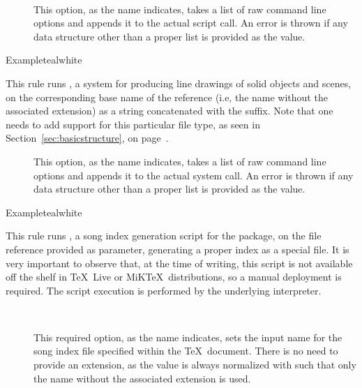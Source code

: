 \begin{description}
\begin{description}
\item[~\rqbox] This option, as the name indicates, takes a list of raw command line options and appends it to the actual script call. An error is thrown if any data structure other than a proper list is provided as the value.
\end{description}

\begin{codebox}{Example}{teal}{\icnote}{white}
\end{codebox}

\item[\rulebox{sketch}]
This rule runs , a system for producing line drawings of solid objects and scenes, on the corresponding base name of the  reference (i.e, the name without the associated extension) as a string concatenated with the  suffix. Note that one needs to add support for this particular file type, as seen in Section~\ref{sec:basicstructure}, on page~\pageref{sec:basicstructure}.

\begin{description}
\item[] This option, as the name indicates, takes a list of raw command line options and appends it to the actual system call. An error is thrown if any data structure other than a proper list is provided as the value.
\end{description}

\begin{codebox}{Example}{teal}{\icnote}{white}
\end{codebox}

\item[\rulebox{songidx}]
This rule runs , a song index generation script for the  package, on the file reference provided as parameter, generating a proper index as a special  file. It is very important to observe that, at the time of writing, this script is not available off the shelf in \TeX\ Live or MiK\TeX\ distributions, so a manual deployment is required. The script execution is performed by the underlying  interpreter.

\begin{description}
\item[~\rqbox] This required option, as the name indicates, sets the input name for the song index file specified within the \TeX\ document. There is no need to provide an extension, as the value is always normalized with  such that only the name without the associated extension is used.


\end{description}
\end{description}
